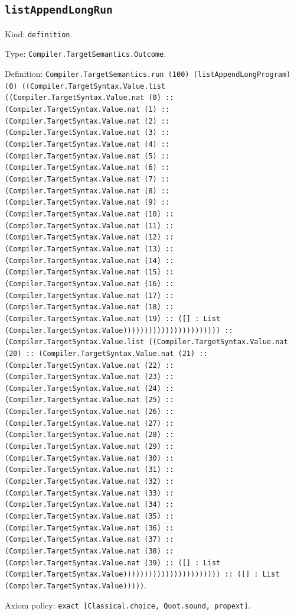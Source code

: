 \documentclass[11pt]{article}
\begin{document}
\subsection*{\texttt{listAppendLongRun}}
\noindent Kind: \texttt{definition}.\par
\noindent Type: \texttt{Compiler.TargetSemantics.Outcome}.\par
\noindent Definition: \texttt{Compiler.TargetSemantics.run (100) (listAppendLongProgram) (0) ((Compiler.TargetSyntax.Value.list ((Compiler.TargetSyntax.Value.nat (0) :: (Compiler.TargetSyntax.Value.nat (1) :: (Compiler.TargetSyntax.Value.nat (2) :: (Compiler.TargetSyntax.Value.nat (3) :: (Compiler.TargetSyntax.Value.nat (4) :: (Compiler.TargetSyntax.Value.nat (5) :: (Compiler.TargetSyntax.Value.nat (6) :: (Compiler.TargetSyntax.Value.nat (7) :: (Compiler.TargetSyntax.Value.nat (8) :: (Compiler.TargetSyntax.Value.nat (9) :: (Compiler.TargetSyntax.Value.nat (10) :: (Compiler.TargetSyntax.Value.nat (11) :: (Compiler.TargetSyntax.Value.nat (12) :: (Compiler.TargetSyntax.Value.nat (13) :: (Compiler.TargetSyntax.Value.nat (14) :: (Compiler.TargetSyntax.Value.nat (15) :: (Compiler.TargetSyntax.Value.nat (16) :: (Compiler.TargetSyntax.Value.nat (17) :: (Compiler.TargetSyntax.Value.nat (18) :: (Compiler.TargetSyntax.Value.nat (19) :: ([] : List (Compiler.TargetSyntax.Value))))))))))))))))))))))) :: (Compiler.TargetSyntax.Value.list ((Compiler.TargetSyntax.Value.nat (20) :: (Compiler.TargetSyntax.Value.nat (21) :: (Compiler.TargetSyntax.Value.nat (22) :: (Compiler.TargetSyntax.Value.nat (23) :: (Compiler.TargetSyntax.Value.nat (24) :: (Compiler.TargetSyntax.Value.nat (25) :: (Compiler.TargetSyntax.Value.nat (26) :: (Compiler.TargetSyntax.Value.nat (27) :: (Compiler.TargetSyntax.Value.nat (28) :: (Compiler.TargetSyntax.Value.nat (29) :: (Compiler.TargetSyntax.Value.nat (30) :: (Compiler.TargetSyntax.Value.nat (31) :: (Compiler.TargetSyntax.Value.nat (32) :: (Compiler.TargetSyntax.Value.nat (33) :: (Compiler.TargetSyntax.Value.nat (34) :: (Compiler.TargetSyntax.Value.nat (35) :: (Compiler.TargetSyntax.Value.nat (36) :: (Compiler.TargetSyntax.Value.nat (37) :: (Compiler.TargetSyntax.Value.nat (38) :: (Compiler.TargetSyntax.Value.nat (39) :: ([] : List (Compiler.TargetSyntax.Value))))))))))))))))))))))) :: ([] : List (Compiler.TargetSyntax.Value)))))}.\par
\noindent Axiom policy: \texttt{exact [Classical.choice, Quot.sound, propext]}.\par
\end{document}
